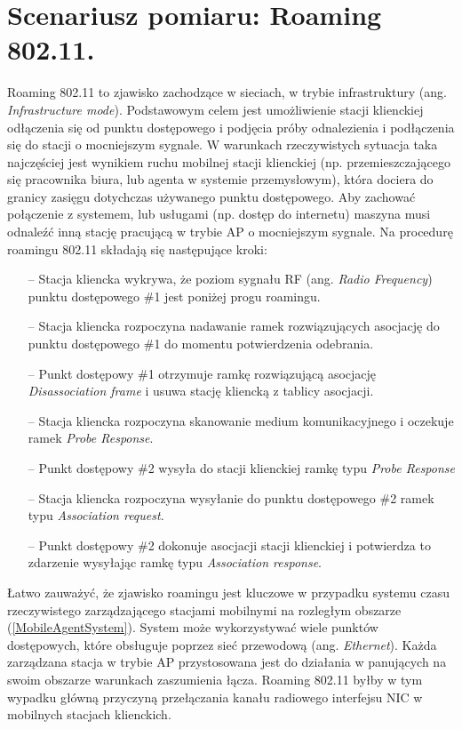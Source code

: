 \section{Scenariusz pomiaru: Roaming 802.11.}
Roaming 802.11 to zjawisko zachodzące w sieciach, w trybie infrastruktury (ang. \emph{Infrastructure mode}). Podstawowym celem jest umożliwienie stacji klienckiej odłączenia się od punktu dostępowego i podjęcia próby odnalezienia i podłączenia się do stacji o mocniejszym sygnale. W warunkach rzeczywistych sytuacja taka najczęściej jest wynikiem ruchu mobilnej stacji klienckiej (np. przemieszczającego się pracownika biura, lub agenta w systemie przemysłowym), która dociera do granicy zasięgu dotychczas używanego punktu dostępowego. Aby zachować połączenie z systemem, lub usługami (np. dostęp do internetu) maszyna musi odnaleźć inną stację pracującą w trybie AP o mocniejszym sygnale. Na procedurę roamingu 802.11 składają się następujące kroki:
\begin{itemize}
\item[--] Stacja kliencka wykrywa, że poziom sygnału RF (ang. \emph{Radio Frequency})
punktu dostępowego \#1 jest poniżej progu roamingu.
\item[--] Stacja kliencka rozpoczyna nadawanie ramek rozwiązujących asocjację do punktu dostępowego \#1 do momentu potwierdzenia odebrania.
\item[--] Punkt dostępowy \#1 otrzymuje ramkę rozwiązującą asocjację \emph{Disassociation frame} i usuwa stację kliencką z tablicy asocjacji.
\item[--] Stacja kliencka rozpoczyna skanowanie medium komunikacyjnego i oczekuje ramek \emph{Probe Response}.
\item[--] Punkt dostępowy \#2 wysyła do stacji klienckiej ramkę typu \emph{Probe Response}
\item[--] Stacja kliencka rozpoczyna wysyłanie do punktu dostępowego \#2 ramek typu \emph{Association request}.
\item[--] Punkt dostępowy \#2 dokonuje asocjacji stacji klienckiej i potwierdza to zdarzenie wysyłając ramkę typu \emph{Association response}.
\end{itemize}

Łatwo zauważyć, że zjawisko roamingu jest kluczowe w przypadku systemu czasu rzeczywistego zarządzającego stacjami mobilnymi na rozległym obszarze (\ref{MobileAgentSystem}). System może wykorzystywać wiele punktów dostępowych, które obsługuje poprzez sieć przewodową (ang. \emph{Ethernet}). Każda zarządzana stacja w trybie AP przystosowana jest do działania w panujących na swoim obszarze warunkach zaszumienia łącza. Roaming 802.11 byłby w tym wypadku główną przyczyną przełączania kanału radiowego interfejsu NIC w mobilnych stacjach klienckich. 


